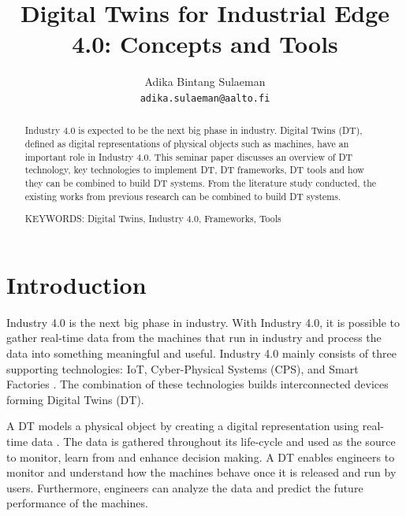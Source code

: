 \documentclass[article,table]{aaltoseries}
\begin{document}
 

\title{Digital Twins for Industrial Edge 4.0: Concepts and Tools}

\author{Adika Bintang Sulaeman%
\\\textnormal{\texttt{adika.sulaeman@aalto.fi}}} %


\maketitle


\begin{abstract}
  Industry 4.0 is expected to be the next big phase in industry. Digital Twins (DT), defined as digital representations of physical objects such as machines, have an important role in Industry 4.0. This seminar paper discusses an overview of DT technology, key technologies to implement DT, DT frameworks, DT tools and how they can be combined to build DT systems. From the literature study conducted, the existing works from previous research can be combined to build DT systems.
  
\vspace{3mm}
\noindent KEYWORDS: Digital Twins, Industry 4.0, Frameworks, Tools

\end{abstract}




\section{Introduction}

Industry 4.0 is the next big phase in industry. With Industry 4.0, it is possible to gather real-time data from the machines that run in industry and process the data into something meaningful and useful. Industry 4.0 mainly consists of three supporting technologies: IoT, Cyber-Physical Systems (CPS), and Smart Factories \cite{hermann2016design}. The combination of these technologies builds interconnected devices forming Digital Twins (DT).

A DT models a physical object by creating a digital representation using real-time data \cite{Cheatshe3:online}. The data is gathered throughout its life-cycle and used as the source to monitor, learn from and enhance decision making. A DT enables engineers to monitor and understand how the machines behave once it is released and run by users. Furthermore, engineers can analyze the data and predict the future performance of the machines.
\end{document}
